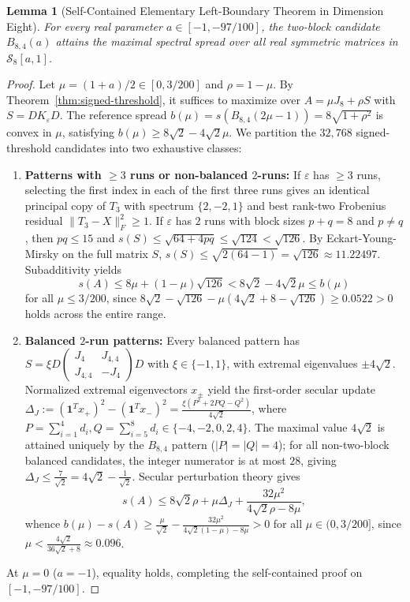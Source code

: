 \documentclass[11pt,reqno]{article}
\newtheorem{lemma}[theorem]{Lemma}
\theoremstyle{definition}
\begin{document}
\begin{lemma}[Self-Contained Elementary Left-Boundary Theorem in Dimension Eight]\label{lem:elementary-left-strip}
For every real parameter $a \in [-1, -97/100]$, the two-block candidate $B_{8, 4}(a)$ attains the maximal spectral spread over all real symmetric matrices in $\mathcal{S}_8[a, 1]$.
\end{lemma}
\begin{proof}
Let $\mu = (1+a)/2 \in [0, 3/200]$ and $\rho = 1-\mu$. By Theorem~\ref{thm:signed-threshold}, it suffices to maximize over $A = \mu J_8 + \rho S$ with $S = D K_\varepsilon D$. The reference spread $b(\mu) = s(B_{8, 4}(2\mu-1)) = 8\sqrt{1+\rho^2}$ is convex in $\mu$, satisfying $b(\mu) \ge 8\sqrt{2} - 4\sqrt{2}\mu$.
We partition the $32{,}768$ signed-threshold candidates into two exhaustive classes:
\begin{enumerate}
    \item \textbf{Patterns with $\ge 3$ runs or non-balanced $2$-runs:} If $\varepsilon$ has $\ge 3$ runs, selecting the first index in each of the first three runs gives an identical principal copy of $T_3$ with spectrum $\{2, -2, 1\}$ and best rank-two Frobenius residual $\|T_3 - X\|_F^2 \ge 1$. If $\varepsilon$ has $2$ runs with block sizes $p + q = 8$ and $p \ne q$, then $pq \le 15$ and $s(S) \le \sqrt{64 + 4pq} \le \sqrt{124} < \sqrt{126}$. By Eckart-Young-Mirsky on the full matrix $S$, $s(S) \le \sqrt{2(64-1)} = \sqrt{126} \approx 11.22497$. Subadditivity yields
    \[
    s(A) \le 8\mu + (1-\mu)\sqrt{126} < 8\sqrt{2} - 4\sqrt{2}\mu \le b(\mu)
    \]
    for all $\mu \le 3/200$, since $8\sqrt{2} - \sqrt{126} - \mu(4\sqrt{2} + 8 - \sqrt{126}) \ge 0.0522 > 0$ holds across the entire range.
    \item \textbf{Balanced $2$-run patterns:} Every balanced pattern has $S = \xi D \begin{pmatrix} J_4 & J_{4, 4} \\ J_{4, 4} & -J_4 \end{pmatrix} D$ with $\xi \in \{-1, 1\}$, with extremal eigenvalues $\pm 4\sqrt{2}$. Normalized extremal eigenvectors $x_\pm$ yield the first-order secular update $\Delta_J := (\mathbf{1}^T x_+)^2 - (\mathbf{1}^T x_-)^2 = \frac{\xi(P^2 + 2PQ - Q^2)}{4\sqrt{2}}$, where $P = \sum_{i=1}^4 d_i, Q = \sum_{i=5}^8 d_i \in \{-4, -2, 0, 2, 4\}$. The maximal value $4\sqrt{2}$ is attained uniquely by the $B_{8, 4}$ pattern ($|P|=|Q|=4$); for all non-two-block balanced candidates, the integer numerator is at most $28$, giving $\Delta_J \le \frac{7}{\sqrt{2}} = 4\sqrt{2} - \frac{1}{\sqrt{2}}$. Secular perturbation theory gives
    \[
    s(A) \le 8\sqrt{2}\rho + \mu\Delta_J + \frac{32\mu^2}{4\sqrt{2}\rho - 8\mu},
    \]
    whence $b(\mu) - s(A) \ge \frac{\mu}{\sqrt{2}} - \frac{32\mu^2}{4\sqrt{2}(1-\mu) - 8\mu} > 0$ for all $\mu \in (0, 3/200]$, since $\mu < \frac{4\sqrt{2}}{36\sqrt{2}+8} \approx 0.096$.
\end{enumerate}
At $\mu = 0$ ($a=-1$), equality holds, completing the self-contained proof on $[-1, -97/100]$.
\end{proof}
\end{document}
